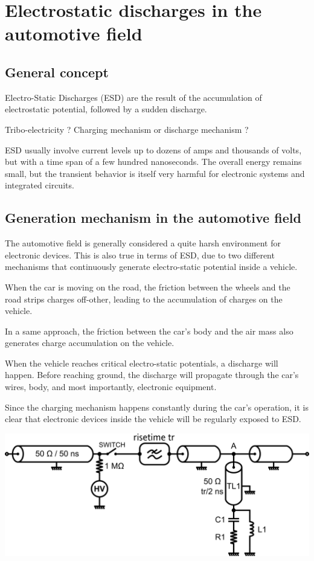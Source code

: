 \section{Electrostatic discharges in the automotive field}
\subsection{General concept}
Electro-Static Discharges (ESD) are the result of the accumulation of electrostatic potential,
followed by a sudden discharge.

Tribo-electricity ? Charging mechanism or discharge mechanism ?

ESD usually involve current levels up to dozens of amps and thousands of volts, but with a time span of a few hundred nanoseconds.
The overall energy remains small, but the transient behavior is itself very harmful for electronic systems and integrated circuits.

\subsection{Generation mechanism in the automotive field}
The automotive field is generally considered a quite harsh environment for electronic devices.
This is also true in terms of ESD, due to two different mechanisms that continuously generate electro-static potential inside a vehicle.

When the car is moving on the road, the friction between the wheels and the road strips charges off-other, leading to the accumulation of
charges on the vehicle.

In a same approach, the friction between the car's body and the air mass also generates charge accumulation on the vehicle.

When the vehicle reaches critical electro-static potentials, a discharge will happen. Before reaching ground, the discharge will propagate through
the car's wires, body, and most importantly, electronic equipment.

Since the charging mechanism happens constantly during the car's operation, it is clear that electronic devices inside the vehicle will be regularly
exposed to ESD.

\includegraphics[width=\textwidth,height=\textheight,keepaspectratio]{src/1/figures/tlp_iec.png}
